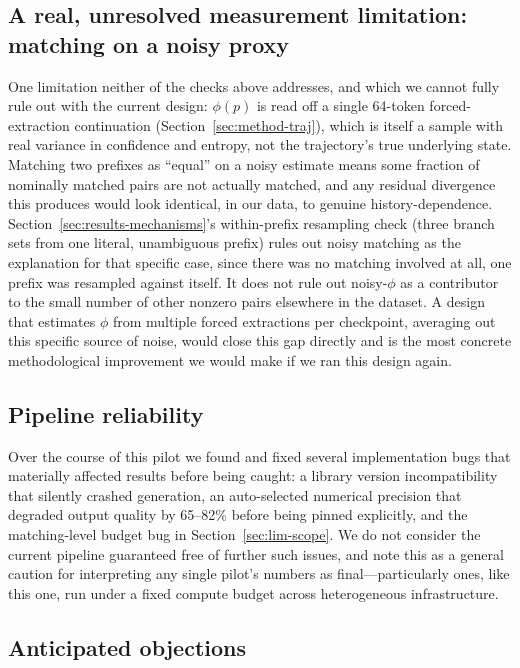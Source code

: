 \documentclass{article}
\begin{document}
\subsection{A real, unresolved measurement limitation: matching on a noisy proxy}
\label{sec:lim-noisystate}

One limitation neither of the checks above addresses, and which we cannot fully rule out with the current design: $\phi(p)$ is read off a single 64-token forced-extraction continuation (Section~\ref{sec:method-traj}), which is itself a sample with real variance in confidence and entropy, not the trajectory's true underlying state. Matching two prefixes as ``equal'' on a noisy estimate means some fraction of nominally matched pairs are not actually matched, and any residual divergence this produces would look identical, in our data, to genuine history-dependence. Section~\ref{sec:results-mechanisms}'s within-prefix resampling check (three branch sets from one literal, unambiguous prefix) rules out noisy matching as the explanation for that specific case, since there was no matching involved at all, one prefix was resampled against itself. It does not rule out noisy-$\phi$ as a contributor to the small number of other nonzero pairs elsewhere in the dataset. A design that estimates $\phi$ from multiple forced extractions per checkpoint, averaging out this specific source of noise, would close this gap directly and is the most concrete methodological improvement we would make if we ran this design again.

\subsection{Pipeline reliability}
\label{sec:lim-pipeline}

Over the course of this pilot we found and fixed several implementation bugs that materially affected results before being caught: a library version incompatibility that silently crashed generation, an auto-selected numerical precision that degraded output quality by 65--82\% before being pinned explicitly, and the matching-level budget bug in Section~\ref{sec:lim-scope}. We do not consider the current pipeline guaranteed free of further such issues, and note this as a general caution for interpreting any single pilot's numbers as final---particularly ones, like this one, run under a fixed compute budget across heterogeneous infrastructure.

\subsection{Anticipated objections}
\label{sec:lim-objections}
\end{document}
